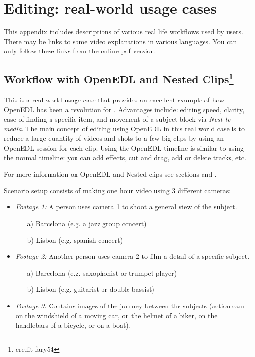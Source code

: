 \chapter{Editing: real-world usage cases}%
\label{cha:editing_real_world_usage}

This appendix includes descriptions of various real life workflows used by \CGG{} users. There may be links to some video explanations in various languages.
You can only follow these links from the online pdf version.

\section{Workflow with OpenEDL and Nested Clips\protect\footnote{credit fary54}}%
\label{sec:workflow_openedl_nested_clips}

This is a real world usage case that provides an excellent example of how OpenEDL has been a
revolution for \CGG{}. Advantages include: editing speed, clarity, ease of finding a specific item,
and movement of a subject block via \textit{Nest to media}.
The main concept of editing using OpenEDL in this real world case is to
reduce a large quantity of videos and shots to a few big clips by using
an OpenEDL session for each clip. Using the OpenEDL timeline is similar to
 using the normal timeline: you can add effects, cut and drag, add or delete
tracks, etc.

For more information on OpenEDL and Nested clips see sections  and .

Scenario setup consists of making one hour video using 3 different cameras:

\begin{itemize}
	\item \textit{Footage 1:} A person uses camera 1 to shoot a general view of the subject.
	\begin{enumerate}
		\item[a)] Barcelona (e.g. a jazz group concert)
		\item[b)] Lisbon (e.g. spanish concert)
	\end{enumerate}
	\item \textit{Footage 2:} Another person uses camera 2 to film a detail of a specific subject.
	\begin{enumerate}
		\item[a)] Barcelona (e.g. saxophonist or trumpet player)
		\item[b)] Lisbon (e.g. guitarist or double bassist)
	\end{enumerate}
	\item \textit{Footage 3:} Contains images of the journey between the subjects (action cam on the windshield of a moving car, on the helmet of a biker, on the handlebars of a bicycle, or on a boat).
\end{itemize}

